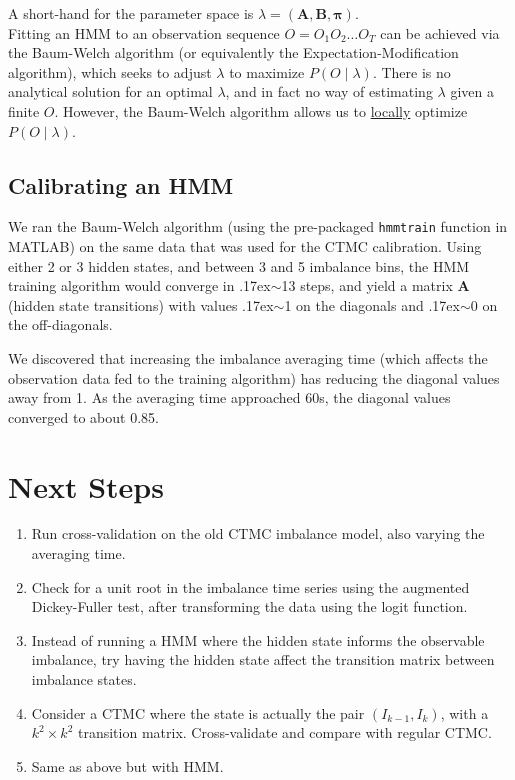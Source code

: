 \documentclass[12pt]{article}
\newcommand\mat[1]{\boldsymbol{#1}}
\begin{document}
A short-hand for the parameter space is $\lambda = (\mat{A},\mat{B},\mat{\pi})$. \\

Fitting an HMM to an observation sequence $O = O_1 O_2 \dots O_T$ can be achieved via the Baum-Welch
algorithm (or equivalently the Expectation-Modification algorithm), which seeks to adjust $\lambda$ 
to maximize $P(O \; | \; \lambda)$. There is no analytical solution for an optimal $\lambda$, and in
fact no way of estimating $\lambda$ given a finite $O$. However, the Baum-Welch algorithm allows us
to \underline{locally} optimize $P(O \; | \; \lambda)$.

\subsection*{Calibrating an HMM}
We ran the Baum-Welch algorithm (using the pre-packaged \texttt{hmmtrain} function in MATLAB) on the
same data that was used for the CTMC calibration. Using either 2 or 3 hidden states, and between 3 
and 5 imbalance bins, the HMM training algorithm would converge in {\raise.17ex\hbox{$\scriptstyle\sim$}}13
steps, and yield a matrix $\mat{A}$ (hidden state transitions) with values 
{\raise.17ex\hbox{$\scriptstyle\sim$}}1 on the diagonals and {\raise.17ex\hbox{$\scriptstyle\sim$}}0 
on the off-diagonals. 

We discovered that increasing the imbalance averaging time (which affects the observation data fed to the
training algorithm) has reducing the diagonal values away from 1. As the averaging time approached 60s, the
diagonal values converged to about 0.85.

\section*{Next Steps}
\begin{enumerate}
\item Run cross-validation on the old CTMC imbalance model, also varying the averaging time.
\item Check for a unit root in the imbalance time series using the augmented Dickey-Fuller test, after transforming the data using the logit function.
\item Instead of running a HMM where the hidden state informs the observable imbalance, try having the hidden state affect the transition matrix between imbalance states. 
\item Consider a CTMC where the state is actually the pair $(I_{k-1}, I_k)$, with a $k^2 \times k^2$ transition matrix. Cross-validate and compare with regular CTMC.
\item Same as above but with HMM. 
\end{enumerate}

\end{document}
